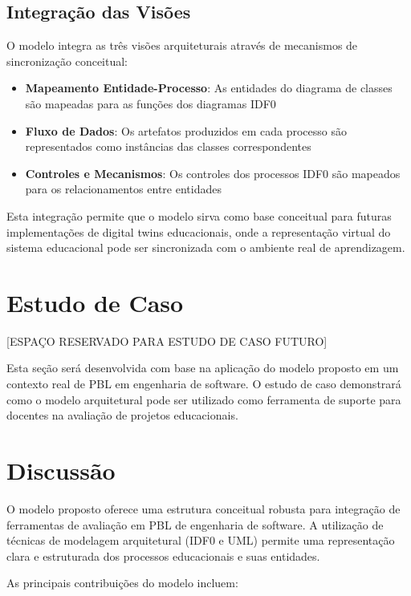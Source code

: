 \documentclass[english, spanish, brazilian]{RBIEarticle} %
\begin{document}
\subsection{Integração das Visões}

O modelo integra as três visões arquiteturais através de mecanismos de sincronização conceitual:

\begin{itemize}
    \item \textbf{Mapeamento Entidade-Processo}: As entidades do diagrama de classes são mapeadas para as funções dos diagramas IDF0
    \item \textbf{Fluxo de Dados}: Os artefatos produzidos em cada processo são representados como instâncias das classes correspondentes
    \item \textbf{Controles e Mecanismos}: Os controles dos processos IDF0 são mapeados para os relacionamentos entre entidades
\end{itemize}

Esta integração permite que o modelo sirva como base conceitual para futuras implementações de digital twins educacionais, onde a representação virtual do sistema educacional pode ser sincronizada com o ambiente real de aprendizagem.

\section{Estudo de Caso}

[ESPAÇO RESERVADO PARA ESTUDO DE CASO FUTURO]

Esta seção será desenvolvida com base na aplicação do modelo proposto em um contexto real de PBL em engenharia de software. O estudo de caso demonstrará como o modelo arquitetural pode ser utilizado como ferramenta de suporte para docentes na avaliação de projetos educacionais.

\section{Discussão}

O modelo proposto oferece uma estrutura conceitual robusta para integração de ferramentas de avaliação em PBL de engenharia de software. A utilização de técnicas de modelagem arquitetural (IDF0 e UML) permite uma representação clara e estruturada dos processos educacionais e suas entidades.

As principais contribuições do modelo incluem:
\end{document}

